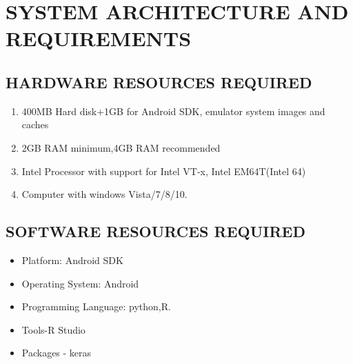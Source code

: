 \documentclass[12pt,a4paper]{report}
\begin{document}
\chapter{SYSTEM ARCHITECTURE AND REQUIREMENTS}
\newpage
\section{HARDWARE RESOURCES REQUIRED}
\begin{enumerate}
	\item	400MB Hard disk+1GB for Android SDK, emulator system images and caches
	\item	2GB RAM minimum,4GB RAM recommended
	\item	Intel Processor with support for Intel VT-x, Intel EM64T(Intel 64)
	\item	Computer  with windows Vista/7/8/10.
	
\end{enumerate}

\section{SOFTWARE RESOURCES REQUIRED}

\begin{itemize}
	\item Platform: Android SDK
\item  Operating System: Android
\item  Programming Language: python,R.
\item  Tools-R Studio
\item  Packages - keras
\end{itemize}

\newpage
\end{document}
